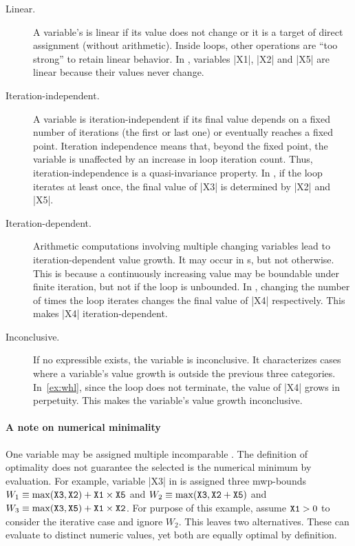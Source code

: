 \begin{description}

\item[Linear.]
A variable's  is linear if its value does not change or it is
a target of direct assignment (without arithmetic). Inside loops, other
operations are \enquote{too strong} to retain linear behavior. In \exname,
variables \pr|X1|, \pr|X2| and \pr|X5| are linear because their values never
change.

\item[Iteration-independent.]
A variable is iteration-independent if its final value depends on a fixed
number of iterations (\eg the first or last one) or eventually reaches a
fixed point. Iteration independence means
that, beyond the fixed point, the variable is unaffected by an increase in
loop iteration count. Thus, iteration-independence is
a quasi-invariance property. In \exname, if the loop
iterates at least once, the final value of \pr|X3| is determined by \pr|X2|
and \pr|X5|.

\item[Iteration-dependent.]
Arithmetic computations involving multiple changing variables lead to
iteration-dependent value growth. It may occur
in s, but not otherwise. This is because a continuously
increasing value may be boundable under finite iteration, but not if the
loop is unbounded. In \explain, changing the number of
times the loop iterates changes the final value of \pr|X4| respectively.
This makes \pr|X4| iteration-dependent.

\item[Inconclusive.]
If no expressible  exists, the variable is inconclusive.
It characterizes cases where a variable's value growth is outside the
previous three categories. In~\autoref{ex:whl}, since the loop does not
terminate, the value of \pr|X4| grows in perpetuity. This makes the
variable's value growth inconclusive.

\end{description}

\paragraph*{A note on numerical minimality}
One variable may be assigned multiple incomparable . The
definition of optimality does not guarantee the
selected  is the numerical minimum by evaluation. For
example, variable \pr|X3| in \exname is assigned three mwp-bounds \(W_1 \equiv
\max(\prm{X3},\prm{X2})+\prm{X1} \times \prm{X5} \) and \(W_2 \equiv
\max(\prm{X3},\prm{X2}+\prm{X5}) \) and \(W_3 \equiv
\max(\prm{X3},\prm{X5})+\prm{X1} \times \prm{X2} \).
For purpose of this example, assume \(\prm{X1}>0\) to consider the iterative
case and ignore \(W_2\). This leaves two alternatives. These can
evaluate to distinct numeric values, yet both are equally optimal by
definition.


